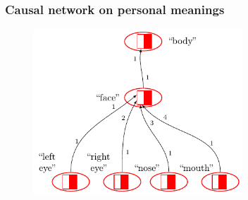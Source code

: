 \documentclass[default]{beamer}
\begin{document}
	\begin{frame}
	\frametitle{Causal network on personal meanings}
	
	\begin{figure}
	\includegraphics[page=3,width=0.7\textwidth]{examples/causnet/caus_net_colored_en}
	\end{figure}
	
	\end{frame}
\end{document}
